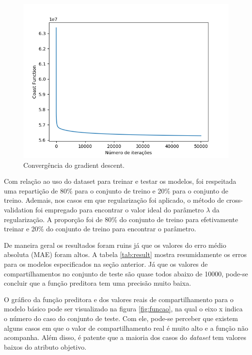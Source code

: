 \documentclass[10pt,twocolumn,letterpaper]{article}
\begin{document}
\begin{figure}
\begin{center}
	\includegraphics[width=0.99\columnwidth]{pics/curva.png}
	\caption{Convergência do gradient descent.}
	\label{fig:complex}   
\end{center} 
\end{figure} 

Com relação ao uso do dataset para treinar e testar os modelos, foi respeitada uma repartição de 80\% para o conjunto de treino e 20\% para o conjunto de treino. Ademais, nos casos em que regularização foi aplicado, o método de cross-validation foi empregado para encontrar o valor ideal do parâmetro $\lambda$ da regularização. A proporção foi de 80\% do conjunto de treino para efetivamente treinar e 20\% do conjunto de treino para encontrar o parâmetro.

De maneira geral os resultados foram ruins já que os valores do erro médio absoluta (MAE) foram altos. A tabela \ref{tab:result} mostra resumidamente os erros para os modelos especificados na seção anterior. Já que os valores de compartilhamentos no conjunto de teste são quase todos abaixo de 10000, pode-se concluir que a função preditora tem uma precisão muito baixa. 

O gráfico da função preditora e dos valores reais de compartilhamento para o modelo básico pode ser visualizado na figura \ref{fig:funcao}, na qual o eixo x indica o número do caso do conjunto de teste. Com ele, pode-se perceber que existem alguns casos em que o valor de compartilhamento real é muito alto e a função não acompanha. Além disso, é patente que a maioria dos casos do \textit{dataset} tem valores baixos do atributo objetivo.
\end{document}
